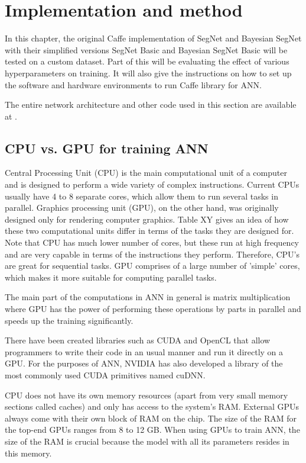 \chapter{Implementation and method}

In this chapter, the original Caffe implementation of SegNet and Bayesian SegNet with their simplified versions SegNet Basic and Bayesian SegNet Basic will be tested on a custom dataset. Part of this will be evaluating the effect of various hyperparameters on training. It will also give the instructions on how to set up the software and hardware environments to run Caffe library for ANN.

The entire network architecture and other code used in this section are available at \cite{filip_github}.

\section{CPU vs. GPU for training ANN}

Central Processing Unit (CPU) is the main computational unit of a computer and is designed to perform a wide variety of complex instructions. Current CPUs usually have 4 to 8 separate cores, which allow them to run several tasks in parallel. Graphics processing unit (GPU), on the other hand, was originally designed only for rendering computer graphics. Table XY gives an idea of how these two computational units differ in terms of the tasks they are designed for. Note that CPU has much lower number of cores, but these run at high frequency and are very capable in terms of the instructions they perform. Therefore, CPU's are great for sequential tasks. GPU comprises of a large number of 'simple' cores, which makes it more suitable for computing parallel tasks. 

The main part of the computations in ANN in general is matrix multiplication where GPU has the power of performing these operations by parts in parallel and speeds up the training significantly.

There have been created libraries such as CUDA and OpenCL that allow programmers to write their code in an usual manner and run it directly on a GPU. For the purposes of ANN, NVIDIA has also developed a library of the most commonly used CUDA primitives named cuDNN. 
 
CPU does not have its own memory resources (apart from very small memory sections called caches) and only has access to the system's RAM. External GPUs always come with their own block of RAM on the chip. The size of the RAM for the top-end GPUs ranges from 8 to 12 GB. When using GPUs to train ANN, the size of the RAM is crucial because the model with all its parameters resides in this memory. 

